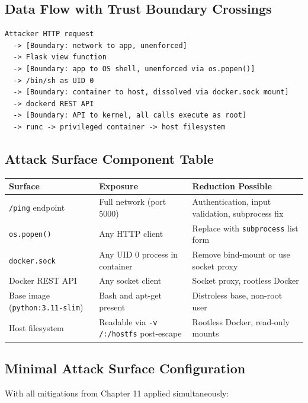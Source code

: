 \subsection{Data Flow with Trust Boundary Crossings}

\begin{lstlisting}
Attacker HTTP request
  -> [Boundary: network to app, unenforced]
  -> Flask view function
  -> [Boundary: app to OS shell, unenforced via os.popen()]
  -> /bin/sh as UID 0
  -> [Boundary: container to host, dissolved via docker.sock mount]
  -> dockerd REST API
  -> [Boundary: API to kernel, all calls execute as root]
  -> runc -> privileged container -> host filesystem
\end{lstlisting}

\subsection{Attack Surface Component Table}

\begin{center}
\begin{tabular}{p{3.5cm}p{3.5cm}p{5cm}}
\hline
\textbf{Surface} & \textbf{Exposure} & \textbf{Reduction Possible} \\
\hline
\texttt{/ping} endpoint & Full network (port 5000) & Authentication, input validation, subprocess fix \\
\texttt{os.popen()} & Any HTTP client & Replace with \texttt{subprocess} list form \\
\texttt{docker.sock} & Any UID 0 process in container & Remove bind-mount or use socket proxy \\
Docker REST API & Any socket client & Socket proxy, rootless Docker \\
Base image (\texttt{python:3.11-slim}) & Bash and apt-get present & Distroless base, non-root user \\
Host filesystem & Readable via \texttt{-v /:/hostfs} post-escape & Rootless Docker, read-only mounts \\
\hline
\end{tabular}
\end{center}

\subsection{Minimal Attack Surface Configuration}

With all mitigations from Chapter 11 applied simultaneously:

